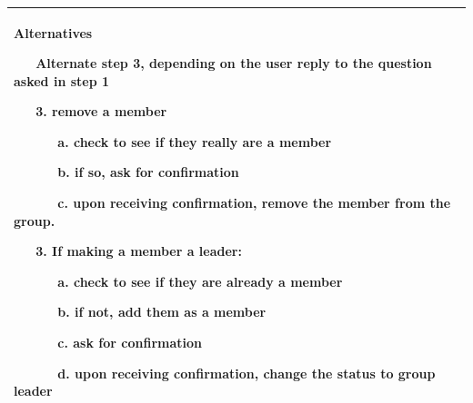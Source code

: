\documentclass[letterpaper]{article}
\newcommand\textstyleDefaultParagraphFont[1]{#1}
\begin{document}
\begin{flushleft}
\begin{supertabular}{|m{6.42126in}|}
{\bfseries\color{black} Alternatives}

{\color{black} \textstyleDefaultParagraphFont{\textbf{\ \ \ }}Alternate
step 3, depending on the user reply to the question asked in step 1}

{\color{black} \ \ \ 3. remove a member}

{\color{black} \ \ \ \ \ \ a. check to see if they really are a member}

{\color{black} \ \ \ \ \ \ b. if so, ask for confirmation}

{\color{black} \ \ \ \ \ \ c. upon receiving confirmation, remove the
member from the group.}

{\color{black} \ \ \ 3. If making a member a leader:}

{\color{black} \ \ \ \ \ \ a. check to see if they are already a member}

{\color{black} \ \ \ \ \ \ b. if not, add them as a member}

{\color{black} \ \ \ \ \ \ c. ask for confirmation}

\color{black} \ \ \ \ \ \ d. upon receiving confirmation, change the
status to group leader\\\hline
\end{supertabular}
\end{flushleft}

\bigskip
\end{document}

